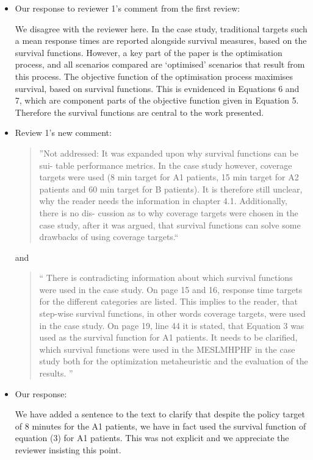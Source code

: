 \documentclass{article}
\begin{document}
\begin{itemize}
\item Our response to reviewer 1's comment from the first review:

We disagree with the reviewer here. In the case study, traditional targets such
a mean response times are reported alongside survival measures, based on
the survival functions. However, a key part of the paper is the
optimisation process, and all scenarios compared are `optimised'
scenarios that result from this process. The objective function of the
optimisation process maximises survival, based on survival functions.
This is evnidenced in Equations 6 and 7, which are component parts of
the objective function given in Equation 5. Therefore the survival
functions are central to the work presented.

\item Review 1's new comment:

\begin{quote}
''Not addressed: It was expanded upon why survival functions can be sui-
table performance metrics. In the case study however, coverage targets
were used (8 min target for A1 patients, 15 min target for A2 patients
and 60 min target for B patients). It is therefore still unclear, why the
reader needs the information in chapter 4.1. Additionally, there is no dis-
cussion as to why coverage targets were chosen in the case study, after
it was argued, that survival functions can solve some drawbacks of using
coverage targets.``
\end{quote}

and

\begin{quote}
    ``
There is contradicting information about which survival functions were
used in the case study. On page 15 and 16, response time targets for the
different categories are listed. This implies to the reader, that step-wise
survival functions, in other words coverage targets, were used in the case
study. On page 19, line 44 it is stated, that Equation 3 was used as the
survival function for A1 patients. It needs to be clarified, which survival
functions were used in the MESLMHPHF in the case study both for the
optimization metaheuristic and the evaluation of the results.
    ''
\end{quote}

\item Our response:

We have added a sentence to the text to clarify that despite the policy target
of 8 minutes for the A1 patients, we have in fact used the survival function of
equation (3) for A1 patients. This was not explicit and we appreciate the
reviewer insisting this point.


\end{itemize}
\end{document}
